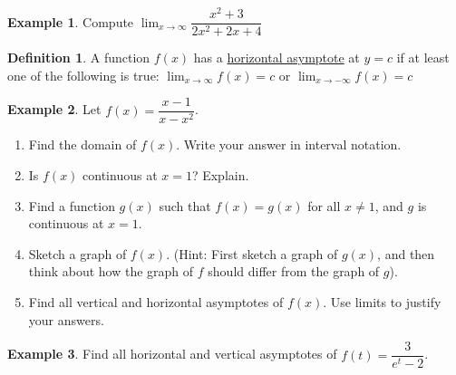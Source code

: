 \documentclass{article}
\theoremstyle{definition}
\newtheorem{ex}{Example}[subsection]
\newtheorem*{defn}{Definition}
\newcommand*{\dlim}{\displaystyle\lim}
\renewcommand{\u}[1]{\underline{#1}}
\begin{document}
\begin{ex}
Compute $\dlim_{x\to\infty}\dfrac{x^2+3}{2x^2+2x+4}$
\end{ex}
\vspace{2in}

\begin{defn}
A function $f(x)$ has a \u{horizontal asymptote} at $y=c$ if at least one of the following is true: $\dlim_{x\to\infty}f(x)=c$ or $\dlim_{x\to-\infty} f(x)=c$
\end{defn}

\begin{ex}
Let $f(x)=\dfrac{x-1}{x-x^2}$. 
\begin{enumerate}
\item Find the domain of $f(x)$. Write your answer in interval notation.
\item Is $f(x)$ continuous at $x=1$? Explain.
\item Find a function $g(x)$ such that $f(x)=g(x)$ for all $x\neq1$, and $g$ is continuous at $x=1$.
\item Sketch a graph of $f(x)$. (Hint: First sketch a graph of $g(x)$, and then think about how the graph of $f$ should differ from the graph of $g$).
\item Find all vertical and horizontal asymptotes of $f(x)$. Use limits to justify your answers.
\end{enumerate}
\end{ex}
\vfill

\newpage
\text{ }
\vfill
\begin{ex}
Find all horizontal and vertical asymptotes of $f(t)=\dfrac{3}{e^t-2}$.
\end{ex}
\vfill

\end{document}
